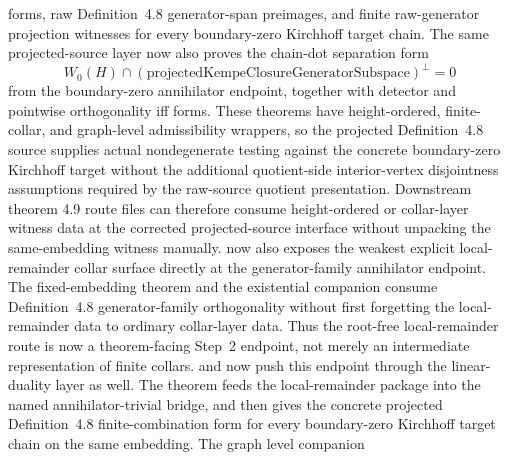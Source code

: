 \documentclass[11pt]{article}
\begin{document}
forms, raw Definition~4.8 generator-span preimages, and finite raw-generator
projection witnesses for every boundary-zero Kirchhoff target chain.  The same
projected-source layer now also proves the chain-dot separation form
\[
  W_0(H) \cap (\mathrm{projectedKempeClosureGeneratorSubspace})^\perp
  = 0
\]
from the boundary-zero annihilator endpoint, together with detector and
pointwise orthogonality iff forms.  These theorems have height-ordered,
finite-collar, and graph-level admissibility wrappers, so the projected
Definition~4.8 source supplies actual nondegenerate testing against the
concrete boundary-zero Kirchhoff target without the additional quotient-side
interior-vertex disjointness assumptions required by the raw-source quotient
presentation.  Downstream
theorem 4.9 route files can therefore consume height-ordered or collar-layer
witness data at the corrected projected-source interface without unpacking the
same-embedding witness manually.
 now also exposes the weakest
explicit local-remainder collar surface directly at the generator-family
annihilator endpoint.  The fixed-embedding theorem
and the existential companion
consume Definition~4.8 generator-family orthogonality without first forgetting
the local-remainder data to ordinary collar-layer data.  Thus the root-free
local-remainder route is now a theorem-facing Step~2 endpoint, not merely an
intermediate representation of finite collars.
 and
 now push this endpoint through the
linear-duality layer as well.  The theorem
feeds the local-remainder package into the named annihilator-trivial bridge, and
then gives the concrete projected Definition~4.8 finite-combination form for
every boundary-zero Kirchhoff target chain on the same embedding.  The graph
level companion
\end{document}
